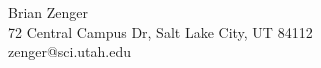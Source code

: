 \documentclass[twocolumn]{cinc}
\begin{document}




\begin{correspondence}
Brian Zenger\\
72 Central Campus Dr, Salt Lake City, UT 84112\\
zenger@sci.utah.edu
\end{correspondence}

\end{document}
